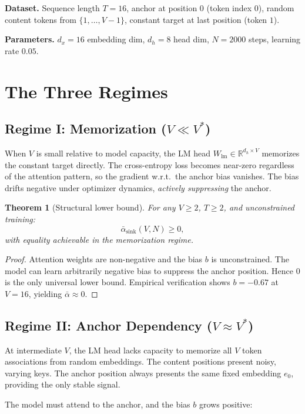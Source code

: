\documentclass[11pt,a4paper]{amsart}
\theoremstyle{plain}
\newtheorem{theorem}{Theorem}[section]
\theoremstyle{definition}
\begin{document}
\textbf{Dataset.} Sequence length $T=16$, anchor at position $0$ (token
index $0$), random content tokens from $\{1,\dots,V-1\}$, constant
target at last position (token $1$).

\textbf{Parameters.} $d_x=16$ embedding dim, $d_h=8$ head dim,
$N=2000$ steps, learning rate $0.05$.

\section{The Three Regimes}

\subsection{Regime I: Memorization ($V \ll V^*$)}

When $V$ is small relative to model capacity, the LM head
$W_{\mathrm{lm}}\in\mathbb{R}^{d_h\times V}$ memorizes the constant
target directly. The cross-entropy loss becomes near-zero regardless of
the attention pattern, so the gradient w.r.t.~the anchor bias vanishes.
The bias drifts negative under optimizer dynamics, \emph{actively
suppressing} the anchor.

\begin{theorem}[Structural lower bound]
For any $V\geq 2$, $T\geq 2$, and unconstrained training:
\[
\bar\alpha_{\mathrm{sink}}(V,N) \geq 0,
\]
with equality achievable in the memorization regime.
\end{theorem}

\begin{proof}
Attention weights are non-negative and the bias $b$ is unconstrained.
The model can learn arbitrarily negative bias to suppress the anchor
position. Hence $0$ is the only universal lower bound. Empirical
verification shows $b=-0.67$ at $V=16$, yielding $\bar\alpha\approx 0$.
\end{proof}

\subsection{Regime II: Anchor Dependency ($V \approx V^*$)}

At intermediate $V$, the LM head lacks capacity to memorize all
$V$ token associations from random embeddings. The content positions
present noisy, varying keys. The anchor position always presents the
same fixed embedding $e_0$, providing the only stable signal.

The model must attend to the anchor, and the bias $b$ grows positive:
\end{document}
